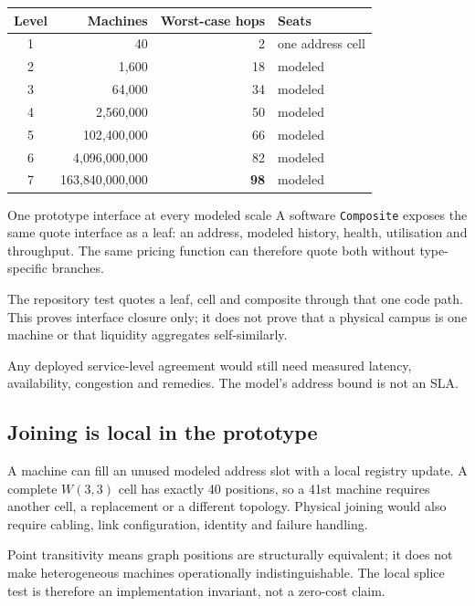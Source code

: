 \documentclass[11pt,letterpaper]{article}
\newcommand{\W}{\ensuremath{W(3,3)}}
\begin{document}
\begin{center}
\renewcommand{\arraystretch}{1.25}
\begin{tabular}{@{}c r r l@{}}
\toprule
\textbf{Level} & \textbf{Machines} & \textbf{Worst-case hops} & \textbf{Seats} \\
\midrule
1 & 40 & 2 & one address cell \\
2 & 1{,}600 & 18 & modeled \\
3 & 64{,}000 & 34 & modeled \\
4 & 2{,}560{,}000 & 50 & modeled \\
5 & 102{,}400{,}000 & 66 & modeled \\
6 & 4{,}096{,}000{,}000 & 82 & modeled \\
7 & 163{,}840{,}000{,}000 & \textbf{98} & modeled \\
\bottomrule
\end{tabular}
\end{center}

\begin{keybox}{One prototype interface at every modeled scale}
A software \texttt{Composite} exposes the same quote interface as a leaf: an
address, modeled history, health, utilisation and throughput. The same pricing
function can therefore quote both without type-specific branches.

\vspace{5pt}
The repository test quotes a leaf, cell and composite through that one code
path. This proves interface closure only; it does not prove that a physical
campus is one machine or that liquidity aggregates self-similarly.
\end{keybox}

Any deployed service-level agreement would still need measured latency,
availability, congestion and remedies. The model's address bound is not an SLA.

\subsection{Joining is local in the prototype}

A machine can fill an unused modeled address slot with a local registry update.
A complete \W{} cell has exactly 40 positions, so a 41st machine requires
another cell, a replacement or a different topology. Physical joining would
also require cabling, link configuration, identity and failure handling.

Point transitivity means graph positions are structurally equivalent; it does
not make heterogeneous machines operationally indistinguishable. The local
splice test is therefore an implementation invariant, not a zero-cost claim.
\end{document}
